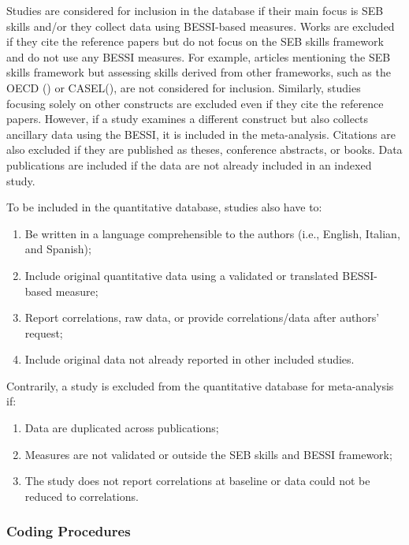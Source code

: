 \documentclass[
  man,
  longtable,
  nolmodern,
  notxfonts,
  notimes,
  colorlinks=true,linkcolor=blue,citecolor=blue,urlcolor=blue]{apa7}
\begin{document}
Studies are considered for inclusion in the database if their main focus
is SEB skills and/or they collect data using BESSI-based measures. Works
are excluded if they cite the reference papers but do not focus on the
SEB skills framework and do not use any BESSI measures. For example,
articles mentioning the SEB skills framework but assessing skills
derived from other frameworks, such as the OECD
() or
CASEL(), are not considered for inclusion. Similarly, studies focusing
solely on other constructs are excluded even if they cite the reference
papers. However, if a study examines a different construct but also
collects ancillary data using the BESSI, it is included in the
meta-analysis. Citations are also excluded if they are published as
theses, conference abstracts, or books. Data publications are included
if the data are not already included in an indexed study.

To be included in the quantitative database, studies also have to:

\begin{enumerate}
\def\labelenumi{\arabic{enumi}.}
\item
  Be written in a language comprehensible to the authors (i.e., English,
  Italian, and Spanish);
\item
  Include original quantitative data using a validated or translated
  BESSI-based measure;
\item
  Report correlations, raw data, or provide correlations/data after
  authors' request;
\item
  Include original data not already reported in other included studies.
\end{enumerate}

Contrarily, a study is excluded from the quantitative database for
meta-analysis if:

\begin{enumerate}
\def\labelenumi{\arabic{enumi}.}
\item
  Data are duplicated across publications;
\item
  Measures are not validated or outside the SEB skills and BESSI
  framework;
\item
  The study does not report correlations at baseline or data could not
  be reduced to correlations.
\end{enumerate}

\subsubsection{Coding Procedures}\label{coding-procedures}
\end{document}
